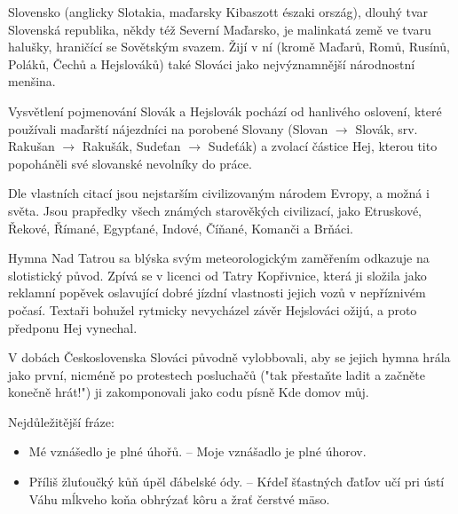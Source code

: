 \documentclass[10.5pt]{book}
\begin{document}
Slovensko (anglicky Slotakia, maďarsky Kibaszott északi ország), dlouhý tvar
Slovenská republika, někdy též Severní Maďarsko, je malinkatá země ve tvaru
halušky, hraničící se Sovětským svazem. Žijí v ní (kromě Maďarů, Romů, Rusínů,
Poláků, Čechů a Hejslováků) také Slováci jako nejvýznamnější národnostní
menšina. 

Vysvětlení pojmenování Slovák a Hejslovák pochází od hanlivého oslovení, které
používali maďarští nájezdníci na porobené Slovany (Slovan $\rightarrow$ Slovák,
srv. Rakušan $\rightarrow$ Rakušák, Sudeťan $\rightarrow$ Sudeťák) a zvolací
částice Hej, kterou tito popoháněli své slovanské nevolníky do práce. 

Dle vlastních citací jsou nejstarším civilizovaným národem Evropy, a možná
i světa. Jsou prapředky všech známých starověkých civilizací, jako Etruskové,
Řekové, Římané, Egypťané, Indové, Číňané, Komanči a Brňáci. 

Hymna Nad Tatrou sa blýska svým meteorologickým zaměřením odkazuje na
slotistický původ. Zpívá se v licenci od Tatry Kopřivnice, která ji složila
jako reklamní popěvek oslavující dobré jízdní vlastnosti jejich vozů
v nepříznivém počasí. Textaři bohužel rytmicky nevycházel závěr Hejslováci
ožijú, a proto předponu Hej vynechal. 

V dobách Československa Slováci původně vylobbovali, aby se jejich hymna hrála
jako první, nicméně po protestech posluchačů ("tak přestaňte ladit a začněte
konečně hrát!") ji zakomponovali jako codu písně Kde domov můj.

Nejdůležitější fráze:
\begin{itemize}
	\item Mé vznášedlo je plné úhořů. – Moje vznášadlo je plné úhorov.
    \item Příliš žluťoučký kůň úpěl ďábelské ódy. – Kŕdeľ šťastných ďatľov učí
    pri ústí Váhu mĺkveho koňa obhrýzať kôru a žrať čerstvé mäso. 
\end{itemize}
    

\newpage
\thispagestyle{empty}
\end{document}
